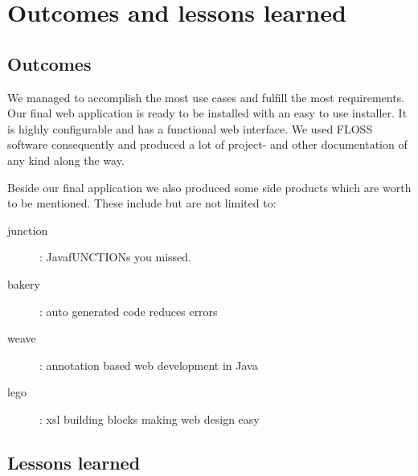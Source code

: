
\section{Outcomes and lessons learned}
\subsection{Outcomes}
We managed to accomplish the most use cases and fulfill the most requirements. Our final web application is ready to be installed with an easy to use installer. It is highly configurable and has a functional web interface. We used FLOSS software consequently and produced a lot of project- and other documentation of any kind along the way.

Beside our final application we also produced some side products which are worth to be mentioned. These include but are not limited to:
\begin{description}
	\item[junction]: JavafUNCTIONs you missed.
	\item[bakery]: auto generated code reduces errors
	\item[weave]: annotation based web development in Java
	\item[lego]: xsl building blocks making web design easy
\end{description}

\subsection{Lessons learned}

